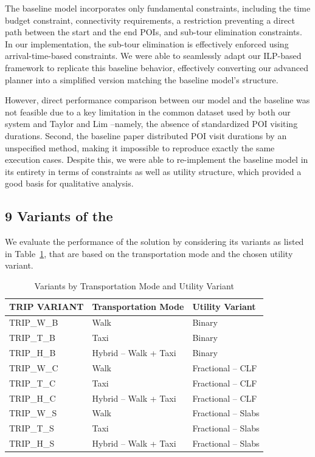 The baseline model incorporates only fundamental constraints, including the time budget constraint, connectivity requirements, a restriction preventing a direct path between the start and the end POIs, and  sub-tour elimination constraints. In our implementation, the sub-tour elimination is effectively enforced using arrival-time-based constraints. We were able to seamlessly adapt our ILP-based framework to replicate this baseline behavior, effectively converting our advanced planner into a simplified version matching the baseline model's structure.

However, direct performance comparison between our model and the baseline was not feasible due to a key limitation in the common dataset used by both our system and Taylor and Lim \cite{taylor2018tour} --namely, the absence of standardized POI visiting durations. Second, the baseline paper distributed POI visit durations by an unspecified method, making it impossible to reproduce exactly the same execution cases. Despite this, we were able to re-implement the baseline model in its entirety in terms of constraints as well as utility structure, which provided a good basis for qualitative analysis. 

\subsection{9 Variants of the \trip}

We evaluate the performance of the \trip solution by considering its variants as listed in Table~\ref{tab:trip_variants}, that are based on the transportation mode and the chosen utility variant. 
\begin{table}[th]
\centering
\begin{tabular}{|l|l|l|}
\hline
\textbf{TRIP VARIANT} & \textbf{Transportation Mode} & \textbf{Utility Variant} \\
\hline
TRIP\_W\_B & Walk & Binary \\
TRIP\_T\_B & Taxi & Binary \\
TRIP\_H\_B & Hybrid -- Walk + Taxi & Binary \\
TRIP\_W\_C & Walk & Fractional -- CLF \\
TRIP\_T\_C & Taxi & Fractional -- CLF \\
TRIP\_H\_C & Hybrid -- Walk + Taxi & Fractional -- CLF \\
TRIP\_W\_S & Walk & Fractional -- Slabs \\
TRIP\_T\_S & Taxi & Fractional -- Slabs \\
TRIP\_H\_S & Hybrid -- Walk + Taxi & Fractional -- Slabs \\
\hline
\end{tabular}
\caption{\trip Variants by Transportation Mode and Utility Variant}
\label{tab:trip_variants}
\end{table}


